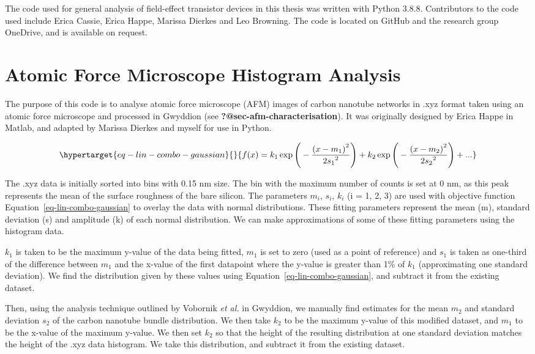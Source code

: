 \documentclass[
  a4paper,
]{scrbook}
\begin{document}
The code used for general analysis of field-effect transistor devices in
this thesis was written with Python 3.8.8. Contributors to the code used
include Erica Cassie, Erica Happe, Marissa Dierkes and Leo Browning. The
code is located on GitHub and the research group OneDrive, and is
available on request.

\hypertarget{sec-histogram-analysis}{%
\section{Atomic Force Microscope Histogram
Analysis}\label{sec-histogram-analysis}}

The purpose of this code is to analyse atomic force microscope (AFM)
images of carbon nanotube networks in .xyz format taken using an atomic
force microscope and processed in Gwyddion (see
\textbf{?@sec-afm-characterisation}). It was originally designed by
Erica Happe in Matlab, and adapted by Marissa Dierkes and myself for use
in Python.

\begin{equation}\protect\hypertarget{eq-lin-combo-gaussian}{}{
f(x) = k_1\exp{\Bigg(-\frac{{(x-m_1)}^{2}}{{2s_1}^{2}}\Bigg)} + k_2\exp{\Bigg(-\frac{{(x-m_2)}^{2}}{{2s_2}^{2}}\Bigg)} + ...
}\label{eq-lin-combo-gaussian}\end{equation}

The .xyz data is initially sorted into bins with 0.15 nm size. The bin
with the maximum number of counts is set at 0 nm, as this peak
represents the mean of the surface roughness of the bare silicon. The
parameters \(m_i\), \(s_i\), \(k_i\) (i = 1, 2, 3) are used with
objective function Equation~\ref{eq-lin-combo-gaussian} to overlay the
data with normal distributions. These fitting parameters represent the
mean (m), standard deviation (s) and amplitude (k) of each normal
distribution. We can make approximations of some of these fitting
parameters using the histogram data.

\(k_1\) is taken to be the maximum y-value of the data being fitted,
\(m_1\) is set to zero (used as a point of reference) and \(s_1\) is
taken as one-third of the difference between \(m_1\) and the x-value of
the first datapoint where the y-value is greater than 1\% of \(k_1\)
(approximating one standard deviation). We find the distribution given
by these values using Equation~\ref{eq-lin-combo-gaussian}, and subtract
it from the existing dataset.

Then, using the analysis technique outlined by Vobornik \emph{et al.}
\autocite{Vobornik2023} in Gwyddion, we manually find estimates for the
mean \(m_2\) and standard deviation \(s_2\) of the carbon nanotube
bundle distribution. We then take \(k_2\) to be the maximum y-value of
this modified dataset, and \(m_1\) to be the x-value of the maximum
y-value. We then set \(k_2\) so that the height of the resulting
distribution at one standard deviation matches the height of the .xyz
data histogram. We take this distribution, and subtract it from the
existing dataset.
\end{document}
